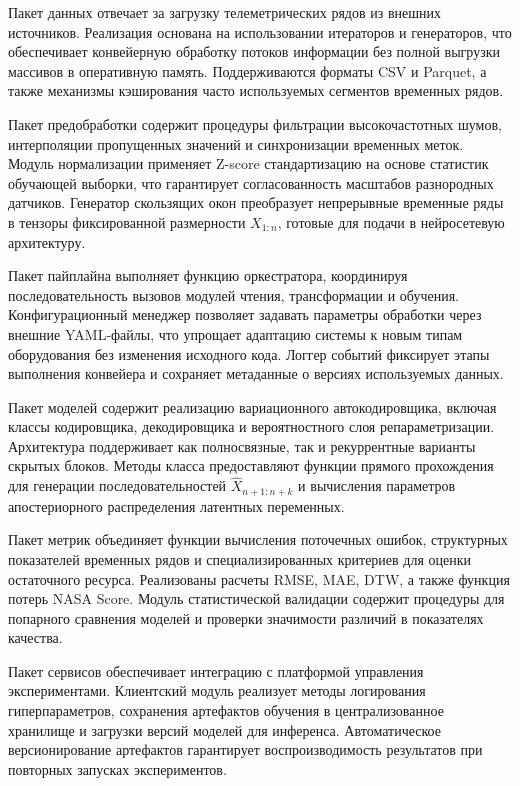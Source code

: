 \documentclass[14pt, a4paper, oneside]{extreport}
\begin{document}
Пакет данных отвечает за загрузку телеметрических рядов из внешних источников. Реализация основана на использовании итераторов и генераторов, что обеспечивает конвейерную обработку потоков информации без полной выгрузки массивов в оперативную память. Поддерживаются форматы CSV и Parquet, а также механизмы кэширования часто используемых сегментов временных рядов.

Пакет предобработки содержит процедуры фильтрации высокочастотных шумов, интерполяции пропущенных значений и синхронизации временных меток. Модуль нормализации применяет Z-score стандартизацию на основе статистик обучающей выборки, что гарантирует согласованность масштабов разнородных датчиков. Генератор скользящих окон преобразует непрерывные временные ряды в тензоры фиксированной размерности $X_{1:n}$, готовые для подачи в нейросетевую архитектуру.

Пакет пайплайна выполняет функцию оркестратора, координируя последовательность вызовов модулей чтения, трансформации и обучения. Конфигурационный менеджер позволяет задавать параметры обработки через внешние YAML-файлы, что упрощает адаптацию системы к новым типам оборудования без изменения исходного кода. Логгер событий фиксирует этапы выполнения конвейера и сохраняет метаданные о версиях используемых данных.

Пакет моделей содержит реализацию вариационного автокодировщика, включая классы кодировщика, декодировщика и вероятностного слоя репараметризации. Архитектура поддерживает как полносвязные, так и рекуррентные варианты скрытых блоков. Методы класса предоставляют функции прямого прохождения для генерации последовательностей $\hat{X}_{n+1:n+k}$ и вычисления параметров апостериорного распределения латентных переменных.

Пакет метрик объединяет функции вычисления поточечных ошибок, структурных показателей временных рядов и специализированных критериев для оценки остаточного ресурса. Реализованы расчеты RMSE, MAE, DTW, а также функция потерь NASA Score. Модуль статистической валидации содержит процедуры для попарного сравнения моделей и проверки значимости различий в показателях качества.

Пакет сервисов обеспечивает интеграцию с платформой управления экспериментами. Клиентский модуль реализует методы логирования гиперпараметров, сохранения артефактов обучения в централизованное хранилище и загрузки версий моделей для инференса. Автоматическое версионирование артефактов гарантирует воспроизводимость результатов при повторных запусках экспериментов.
\end{document}
